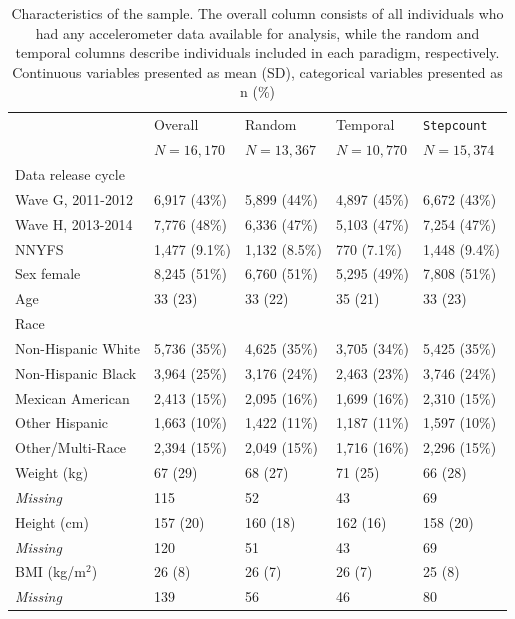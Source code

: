 \begin{table}[H]
\begin{tabular}[t]{lllll}
\toprule
 & Overall & Random & Temporal & \texttt{Stepcount}\\
&$N = 16{,}170$ &  $N = 13{,}367$ &  $N=10{,}770$  & $N=15{,}374$\\
\midrule
Data release cycle &  &  & \\
\hspace{.05in}Wave G, 2011-2012 & 6,917 (43\%) & 5,899 (44\%) & 4,897 (45\%) & 6,672 (43\%)\\
\hspace{.05in}Wave H, 2013-2014 & 7,776 (48\%) & 6,336 (47\%) & 5,103 (47\%) & 7,254 (47\%)\\
\hspace{.05in}NNYFS & 1,477 (9.1\%) & 1,132 (8.5\%) & 770 (7.1\%) & 1,448 (9.4\%)\\
Sex female & 8,245 (51\%) & 6,760 (51\%) & 5,295 (49\%) & 7,808 (51\%)\\
Age & 33 (23) & 33 (22) & 35 (21) & 33 (23)\\
Race &  &  & \\
\hspace{.05in}Non-Hispanic White & 5,736 (35\%) & 4,625 (35\%) & 3,705 (34\%)& 5,425 (35\%)\\
\hspace{.05in}Non-Hispanic Black & 3,964 (25\%) & 3,176 (24\%) & 2,463 (23\%)&  3,746 (24\%)\\
\hspace{.05in}Mexican American & 2,413 (15\%) & 2,095 (16\%) & 1,699 (16\%) & 2,310 (15\%)\\
\hspace{.05in}Other Hispanic & 1,663 (10\%) & 1,422 (11\%) & 1,187 (11\%)&  1,597 (10\%)\\
\hspace{.05in}Other/Multi-Race & 2,394 (15\%) & 2,049 (15\%) & 1,716 (16\%) & 2,296 (15\%)\\
Weight (kg) & 67 (29) & 68 (27) & 71 (25) & 66 (28)\\
\hspace{.05in}\textit{Missing} & 115 & 52 & 43 & 69\\
Height (cm) & 157 (20) & 160 (18) & 162 (16) & 158 (20)\\
\hspace{.05in}\textit{Missing} & 120 & 51 & 43  & 69\\
BMI (kg/m$^2$) & 26 (8) & 26 (7) & 26 (7) &  25 (8)\\
\hspace{.05in}\textit{Missing} & 139 & 56 & 46  & 80\\
\bottomrule
\end{tabular}
\caption{Characteristics of the sample. The overall column consists of all individuals who had any accelerometer data available for analysis, while the random and temporal columns describe individuals included in each paradigm, respectively. Continuous variables presented as mean (SD), categorical variables presented as n (\%)}
\label{tab:popsummary}
\end{table}


